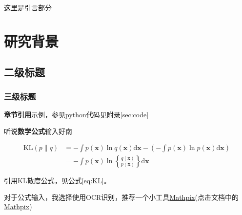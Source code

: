 \documentclass[AutoFakeBold]{LZUthesis}
\begin{document}
\tableofcontents

\renewcommand\listfigurename{插\ 图\ 目\ 录}
\renewcommand\listtablename{表\ 格\ 目\ 录}
\listoffigures
{}
\listoftables
\mainmatter

\Intro
这里是引言部分


\chapter{研究背景}
\section{二级标题}
\subsection{三级标题}
\par \textbf{章节引用}示例，参见python代码见附录\ref{sec:code}
\par 听说\textbf{数学公式}输入好南

\begin{equation}
\begin{aligned}
\mathrm{KL}(p \| q) &=-\int p(\boldsymbol{x}) \ln q(\boldsymbol{x}) \mathrm{d} \boldsymbol{x}-\left(-\int p(\boldsymbol{x}) \ln p(\boldsymbol{x}) \mathrm{d} \boldsymbol{x}\right) \\
&=-\int p(\boldsymbol{x}) \ln \left\{\frac{q(\boldsymbol{x})}{p(\boldsymbol{x})}\right\} \mathrm{d} \boldsymbol{x}
\end{aligned}
\label{eq:KL}
\end{equation}

\par 引用KL散度公式，见公式\ref{eq:KL}。

\par 对于公式输入，我选择使用OCR识别，推荐一个小工具\href{https://accounts.mathpix.com/signup?referral_code=8ZTrrDwYv3}{Mathpix}(点击文档中的\href{https://accounts.mathpix.com/signup?referral_code=8ZTrrDwYv3}{Mathpix})
\end{document}
